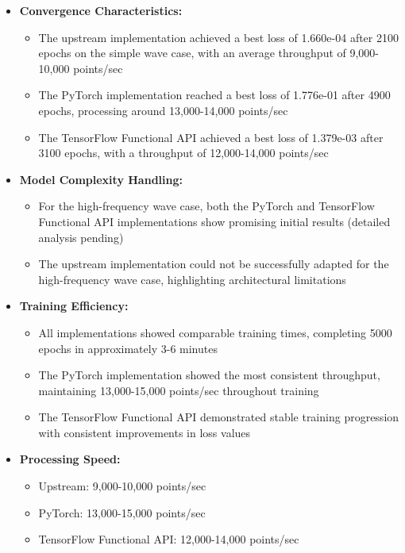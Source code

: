 \documentclass[10pt,journal,compsoc,onecolumn]{IEEEtran}
\begin{document}
\begin{itemize}
    \item \textbf{Convergence Characteristics:}
    \begin{itemize}
        \item The upstream implementation achieved a best loss of 1.660e-04 after 2100 epochs on the simple wave case, with an average throughput of 9,000-10,000 points/sec
        \item The PyTorch implementation reached a best loss of 1.776e-01 after 4900 epochs, processing around 13,000-14,000 points/sec
        \item The TensorFlow Functional API achieved a best loss of 1.379e-03 after 3100 epochs, with a throughput of 12,000-14,000 points/sec
    \end{itemize}
    
    \item \textbf{Model Complexity Handling:}
    \begin{itemize}
        \item For the high-frequency wave case, both the PyTorch and TensorFlow Functional API implementations show promising initial results (detailed analysis pending)
        \item The upstream implementation could not be successfully adapted for the high-frequency wave case, highlighting architectural limitations
    \end{itemize}
    
    \item \textbf{Training Efficiency:}
    \begin{itemize}
        \item All implementations showed comparable training times, completing 5000 epochs in approximately 3-6 minutes
        \item The PyTorch implementation showed the most consistent throughput, maintaining 13,000-15,000 points/sec throughout training
        \item The TensorFlow Functional API demonstrated stable training progression with consistent improvements in loss values
    \end{itemize}
    
    \item \textbf{Processing Speed:}
    \begin{itemize}
        \item Upstream: 9,000-10,000 points/sec
        \item PyTorch: 13,000-15,000 points/sec
        \item TensorFlow Functional API: 12,000-14,000 points/sec
    \end{itemize}
\end{itemize}
\end{document}

